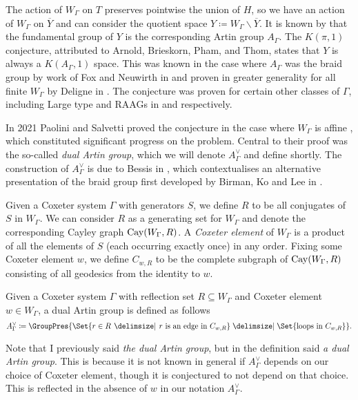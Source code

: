 The action of $W_\Gamma$ on $T$ preserves pointwise the union of $H$, so we have an action of $W_\Gamma$ on $\overline{Y}$ and can consider the quotient space  $Y \coloneq W_\Gamma \backslash \overline{Y}$.
It is known by \cite{lek_homotopy_1983} that the fundamental group of $Y$ is the corresponding Artin group  $A_\Gamma$.
The $K(\pi,1)$ conjecture, attributed to Arnold, Brieskorn, Pham, and Thom, states that $Y$ is always a $K(A_\Gamma,1)$ space.
This was known in the case where $A_\Gamma$ was the braid group by work of Fox and Neuwirth in \cite{fox_neuwirth_braid_1962} and proven in greater generality for all finite $W_\Gamma$ by Deligne in \cite{deligne_immeubles_1972}.
The conjecture was proven for certain other classes of $\Gamma$, including Large type and RAAGs in \cite{hendriks_hyperplane_1985} and \cite{charney_davis_finite_2016} respectively.

In 2021 Paolini and Salvetti proved the conjecture in the case where $W_\Gamma$ is affine \cite{paolini_salvetti_kpi1_2021}, which constituted significant progress on the problem.
Central to their proof was the so-called \emph{dual Artin group}, which we will denote $A^\vee_\Gamma$ and define shortly.
The construction of $A^\vee_\Gamma$ is due to Bessis in \cite{bessis_dual_2003}, which contextualises an alternative presentation of the braid group first developed by Birman, Ko and Lee in \cite{birman_etal_new_1998}.

Given a Coxeter system $\Gamma$ with generators $S$, we define $R$ to be all conjugates of  $S$ in  $W_\Gamma$.
We can consider $R$ as a generating set for $W_\Gamma$ and denote the corresponding Cayley graph  $\operatorname{Cay}(W_\Gamma,R)$.
A \emph{Coxeter element} of  $W_\Gamma$ is a product of all the elements of $S$ (each occurring exactly once) in any order.
Fixing some Coxeter element $w$, we define $C_{w,R}$ to be the complete subgraph of $\operatorname{Cay}(W_\Gamma,R)$ consisting of all geodesics from the identity to $w$.

\begin{definition}
	\label{def:dual_artin}
	Given a Coxeter system $\Gamma$ with reflection set  $R \subseteq W_\Gamma$ and Coxeter element $w \in W_\Gamma$, a dual Artin group is defined as follows
	\[
		A^\vee_\Gamma \coloneq \GroupPres{\Set{r \in R \given r \text{ is an edge in } C_{w,R}} \relations \Set{ \text{loops in } C_{w,R}}}
		.\]
\end{definition}

Note that I previously said \emph{the dual Artin group}, but in the definition said \emph{a dual Artin group}.
This is because it is not known in general if $A^\vee_\Gamma$ depends on our choice of Coxeter element, though it is conjectured to not depend on that choice.
This is reflected in the absence of $w$ in our notation  $A^\vee_\Gamma$.

